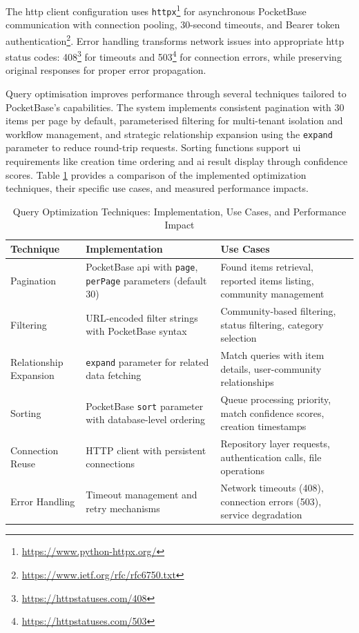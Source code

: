 The \ac{http} client configuration uses \texttt{httpx}\footnote{\url{https://www.python-httpx.org/}} for asynchronous PocketBase communication with connection pooling, 30-second timeouts, and Bearer token authentication\footnote{\url{https://www.ietf.org/rfc/rfc6750.txt}}. Error handling transforms network issues into appropriate \ac{http} status codes: 408\footnote{\url{https://httpstatuses.com/408}} for timeouts and 503\footnote{\url{https://httpstatuses.com/503}} for connection errors, while preserving original responses for proper error propagation.

Query optimisation improves performance through several techniques tailored to PocketBase's capabilities. The system implements consistent pagination with 30 items per page by default, parameterised filtering for multi-tenant isolation and workflow management, and strategic relationship expansion using the \texttt{expand} parameter to reduce round-trip requests. Sorting functions support \ac{ui} requirements like creation time ordering and \ac{ai} result display through confidence scores. Table \ref{tab:query_optimization} provides a comparison of the implemented optimization techniques, their specific use cases, and measured performance impacts.

\begin{table}[htbp]
    \centering
    \caption{Query Optimization Techniques: Implementation, Use Cases, and Performance Impact}
    \label{tab:query_optimization}
    \footnotesize
    \begin{tabular}{p{2.2cm}p{4.5cm}p{6cm}}
        \hline
        \textbf{Technique} & \textbf{Implementation} & \textbf{Use Cases} \\
        \hline
        Pagination & PocketBase \ac{api} with \texttt{page}, \texttt{perPage} parameters (default 30) & Found items retrieval, reported items listing, community management \\
        \hline
        Filtering & URL-encoded filter strings with PocketBase syntax & Community-based filtering, status filtering, category selection \\
        \hline
        Relationship Expansion & \texttt{expand} parameter for related data fetching & Match queries with item details, user-community relationships \\
        \hline
        Sorting & PocketBase \texttt{sort} parameter with database-level ordering & Queue processing priority, match confidence scores, creation timestamps \\
        \hline
        Connection Reuse & HTTP client with persistent connections & Repository layer requests, authentication calls, file operations \\
        \hline
        Error Handling & Timeout management and retry mechanisms & Network timeouts (408), connection errors (503), service degradation \\
        \hline
    \end{tabular}
\end{table}

